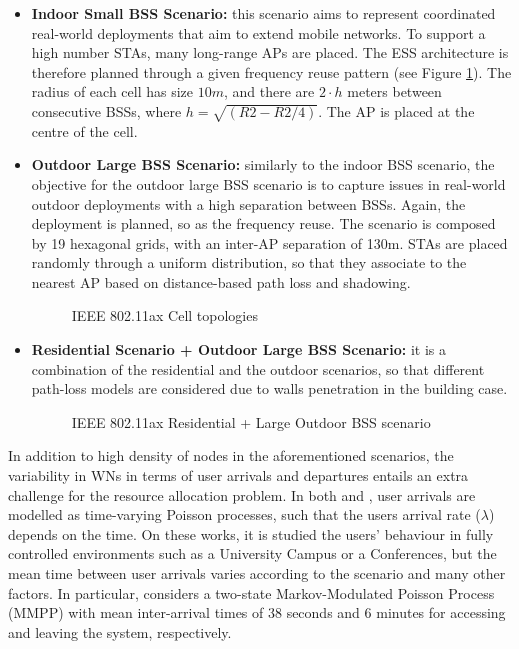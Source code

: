 \documentclass[12pt, a4paper,twoside]{tesi_upf}
\begin{document}
\begin{itemize}
			\item \textbf{Indoor Small BSS  Scenario:} this scenario aims to represent coordinated real-world deployments that aim to extend mobile networks. To support a high number STAs, many long-range APs are placed. The ESS architecture is therefore planned through a given frequency reuse pattern (see Figure \ref{fig:large_ax}). The radius of each cell has size $10 m$, and there are $2 \cdot h$ meters between consecutive BSSs, where $h=\sqrt{(R2-R2/4)}$. The AP is placed at the centre of the cell.			

			\item \textbf{Outdoor Large BSS Scenario:} similarly to the indoor BSS scenario, the objective for the outdoor large BSS scenario is to capture issues in real-world outdoor deployments with a high separation between BSSs. Again, the deployment is planned, so as the frequency reuse. The scenario is composed by 19 hexagonal grids, with an inter-AP separation of 130m. STAs are placed randomly through a uniform distribution, so that they associate to the nearest AP based on distance-based path loss and shadowing.  
			\begin{figure}[h!]
				\centering
				\caption{IEEE 802.11ax Cell topologies}
				\label{fig:large_ax}
			\end{figure}	
		
			\item \textbf{Residential Scenario + Outdoor Large BSS Scenario:} it is a combination of the residential and the outdoor scenarios, so that different path-loss models are considered due to walls penetration in the building case.
			\begin{figure}[h!]
				\centering
				\caption{IEEE 802.11ax Residential + Large Outdoor BSS scenario}
				\label{fig:residential_large_ax}
			\end{figure}	
		\end{itemize}	
	
		In addition to high density of nodes in the aforementioned scenarios, the variability in WNs in terms of user arrivals and departures entails an extra challenge for the resource allocation problem. In both \cite{balachandran2002characterizing} and \cite{papadopouli2005modeling}, user arrivals are modelled as time-varying Poisson processes, such that the users arrival rate ($\lambda$) depends on the time. On these works, it is studied the users' behaviour in fully controlled environments such as a University Campus or a Conferences, but the mean time between user arrivals varies according to the scenario and many other factors. In particular, \cite{papadopouli2005modeling} considers a two-state Markov-Modulated Poisson Process (MMPP) with mean inter-arrival times of 38 seconds and 6 minutes for accessing and leaving the system, respectively. %
			
\end{document}
